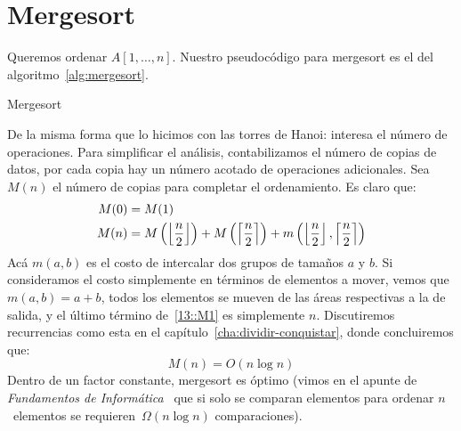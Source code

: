 \section{Mergesort}

  Queremos ordenar \(A[1, \ldots, n]\).
  Nuestro pseudocódigo para mergesort es el del algoritmo~\ref{alg:mergesort}.
  \begin{algorithm}[ht]
    \DontPrintSemicolon\Indp

    \caption{Mergesort}
    \label{alg:mergesort}
  \end{algorithm}
  De la misma forma que lo hicimos con las torres de Hanoi:
  interesa el número de operaciones.
  Para simplificar el análisis,
  contabilizamos el número de copias de datos,
  por cada copia hay un número acotado de operaciones adicionales.
  Sea \(M(n)\) el número de copias para completar el ordenamiento.
  Es claro que:
  \begin{align}
    M(0)
      &= M(1) \notag \\
    M(n)
      &= M\left( \left\lfloor \frac{n}{2} \right\rfloor \right)
           + M\left( \left\lceil \frac{n}{2} \right\rceil \right)
           + m\left( \left\lfloor \frac{n}{2} \right\rfloor,
                     \left\lceil \frac{n}{2} \right\rceil \right)
                 \label{13::M1}
  \end{align}
  Acá \(m(a, b)\)
  es el costo de intercalar dos grupos de tamaños \(a\) y \(b\).
  Si consideramos el costo simplemente en términos de elementos a mover,
  vemos que \(m(a, b) = a + b\),
  todos los elementos se mueven de las áreas respectivas a la de salida,
  y el último término de~\eqref{13::M1} es simplemente \(n\).
  Discutiremos recurrencias como esta
  en el capítulo~\ref{cha:dividir-conquistar},
  donde concluiremos que:
  \begin{equation*}
    M(n)
      = O(n \log n)
  \end{equation*}
  Dentro de un factor constante,
  mergesort es óptimo
  (vimos en el apunte de \emph{Fundamentos de Informática}~%
     \cite{brand17:_fundamentos_informatica}
   que si solo se comparan elementos
   para ordenar \(n\)~elementos
   se requieren~\(\Omega(n \log n)\) comparaciones).

